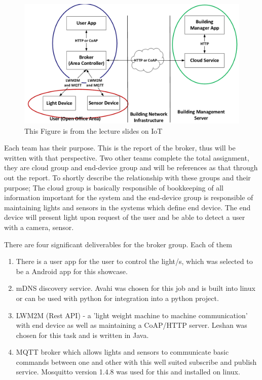 \documentclass[conference]{IEEEtran}
\begin{document}
\begin{figure}[h]
	\begin{center}
		\includegraphics[width=1\linewidth]{img/design}
		\caption{This Figure is from the lecture slides on IoT \cite{slides}}
		\label{fig:fig1}
	\end{center}
\end{figure}

Each team has their purpose. This is the report of the broker, thus will be written with that perspective. Two other teams complete the total assignment, they are cloud group and end-device group and will be references as that through out the report. To shortly describe the relationship with these groups and their purpose; The cloud group is basically responsible of bookkeeping of all information important for the system and the end-device group is responsible of maintaining lights and sensors in the systems which define end device. The end device will present light upon request of the user and be able to detect a user with a camera, sensor.

There are four significant deliverables for the broker group. Each of them 
\begin{enumerate}
\item There is a user app for the user to control the light/s, which was selected to be a Android app for this showcase.
\item mDNS discovery service. Avahi was chosen for this job and is built into linux or can be used with python for integration into a python project.
\item LWM2M (Rest API) - a 'light weight machine to machine communication' with end device as well as maintaining a CoAP/HTTP server. Leshan was chosen for this task and is written in Java.
\item MQTT broker which allows lights and sensors to communicate basic commands between one and other with this well suited subscribe and publish service. Mosquitto version 1.4.8 was used for this and installed on linux.
\end{enumerate}
\end{document}
